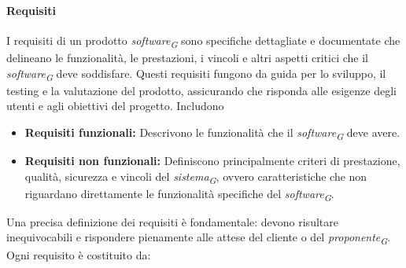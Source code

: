 \paragraph{Requisiti}
I requisiti di un prodotto \textit{software}\textsubscript{\textit{G}} sono specifiche dettagliate e documentate che delineano le funzionalità, le prestazioni, i vincoli e altri aspetti critici che il \textit{software}\textsubscript{\textit{G}} deve soddisfare. Questi requisiti fungono da guida per lo sviluppo, il testing e la valutazione del prodotto, assicurando che risponda alle esigenze degli utenti e agli obiettivi del progetto.
Includono
\begin{itemize}
    \item \textbf{Requisiti funzionali:} Descrivono le funzionalità che il \textit{software}\textsubscript{\textit{G}} deve avere.
    \item \textbf{Requisiti non funzionali:} Definiscono principalmente criteri di prestazione, qualità, sicurezza e vincoli del \textit{sistema}\textsubscript{\textit{G}}, ovvero caratteristiche che non riguardano direttamente le funzionalità specifiche del \textit{software}\textsubscript{\textit{G}}.
\end{itemize}
Una precisa definizione dei requisiti è fondamentale: devono risultare inequivocabili e rispondere pienamente alle attese del cliente o del \textit{proponente}\textsubscript{\textit{G}}.\\
Ogni requisito è costituito da:

